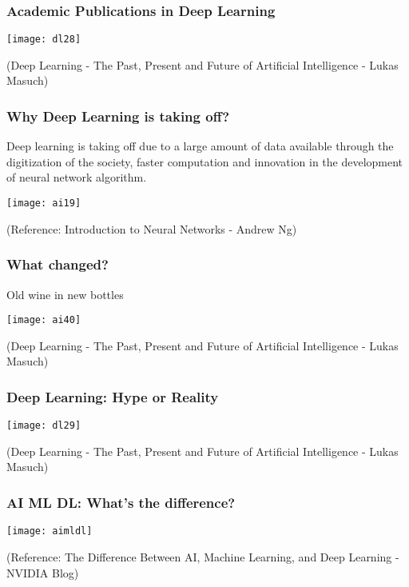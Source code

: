 \begin{frame}[fragile]\frametitle{Academic Publications in Deep Learning}
\begin{center}
\texttt{[image: dl28]}
\end{center}
{\tiny (Deep Learning - The Past, Present and Future of Artificial Intelligence - Lukas Masuch)}
\end{frame}
\begin{frame}[fragile] \frametitle{Why Deep Learning is taking off?}
Deep learning is taking off due to a large amount of data available through the digitization of the society, 
faster computation and innovation in the development of neural network algorithm. 

\begin{center}
\texttt{[image: ai19]}
\end{center}


\tiny{(Reference: Introduction to Neural Networks - Andrew Ng)}

\end{frame}

\begin{frame}[fragile]\frametitle{What changed?}
Old wine in new bottles
\begin{center}
\texttt{[image: ai40]}
\end{center}
{\tiny (Deep Learning - The Past, Present and Future of Artificial Intelligence - Lukas Masuch)}
\end{frame}



\begin{frame}[fragile]\frametitle{Deep Learning: Hype or Reality}
\begin{center}
\texttt{[image: dl29]}
\end{center}
{\tiny (Deep Learning - The Past, Present and Future of Artificial Intelligence - Lukas Masuch)}
\end{frame}


\begin{frame}[fragile] \frametitle{AI ML DL: What's the difference?}
\begin{center}
\texttt{[image: aimldl]}
\end{center}
\tiny{(Reference: The Difference Between AI, Machine Learning, and Deep Learning - NVIDIA Blog)}
\end{frame}

